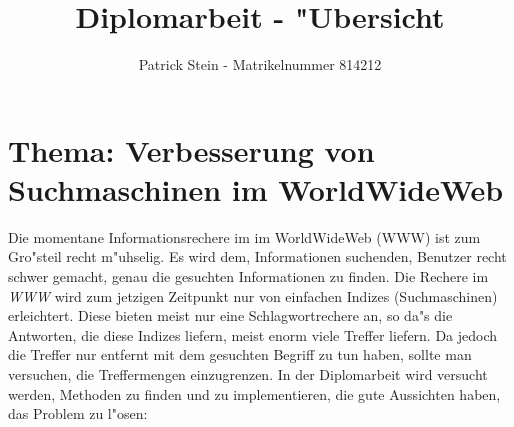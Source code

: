 
\newcommand{\nl}{{\newline}}

\title{Diplomarbeit - "Ubersicht}
\author{Patrick Stein - Matrikelnummer 814212}

\maketitle

\section{Thema: Verbesserung von Suchmaschinen im World\/Wide\/Web}

Die momentane Informationsrechere im im World\/Wide\/Web (WWW) ist zum Gro"steil recht m"uhselig. Es wird dem, Informationen suchenden, Benutzer recht schwer gemacht, genau die gesuchten Informationen zu finden. Die Rechere im {\it WWW} wird zum jetzigen Zeitpunkt nur von einfachen Indizes (Suchmaschinen) erleichtert. Diese bieten meist nur eine Schlagwortrechere an, so da"s die Antworten, die diese Indizes liefern, meist enorm viele Treffer liefern. Da jedoch die Treffer nur entfernt mit dem gesuchten Begriff zu tun haben, sollte man versuchen, die Treffermengen einzugrenzen.\nl
In der Diplomarbeit wird versucht werden, Methoden zu finden und zu implementieren, die gute Aussichten haben, das Problem zu l"osen:
